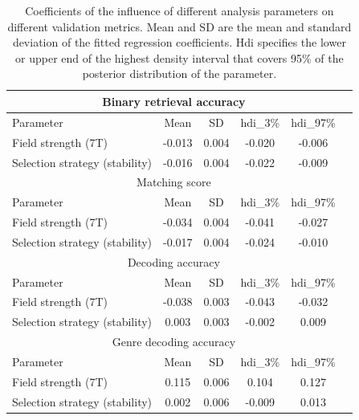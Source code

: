 \noindent
\begin{table}[!htbp]
\centering
\begin{adjustbox}{center}
\begin{tabular}{lccccc}
\multicolumn{5}{c}{Binary retrieval accuracy} \tabularnewline
\hline
Parameter &   Mean &     SD &  hdi\_3\% &  hdi\_97\% \tabularnewline
\hline
Field strength (7T)            & -0.013 &  0.004 &  -0.020 &   -0.006 \tabularnewline
Selection strategy (stability) & -0.016 &  0.004 &  -0.022 &   -0.009 \\
\hline
\multicolumn{5}{c}{Matching score} \tabularnewline
\hline
Parameter &   Mean &     SD &  hdi\_3\% &  hdi\_97\% \\
\hline
Field strength (7T)             & -0.034 &  0.004 &  -0.041 &   -0.027 \\
Selection strategy (stability)  & -0.017 &  0.004 &  -0.024 &   -0.010 \\
\hline
\multicolumn{5}{c}{Decoding accuracy} \tabularnewline
\hline
Parameter &   Mean &     SD &  hdi\_3\% &  hdi\_97\% \\
\hline
Field strength (7T)            & -0.038 &  0.003 &  -0.043 &   -0.032 \\
Selection strategy (stability) &  0.003 &  0.003 &  -0.002 &    0.009 \\
\hline
\multicolumn{5}{c}{Genre decoding accuracy} \tabularnewline
\hline
Parameter &   Mean &     SD &  hdi\_3\% &  hdi\_97\% \\
\hline
Field strength (7T)            &  0.115 &  0.006 &   0.104 &    0.127 \\
Selection strategy (stability) &  0.002 &  0.006 &  -0.009 &    0.013 \\
\hline
\end{tabular}
\end{adjustbox}
\caption{Coefficients of the influence of different analysis parameters on different validation metrics. Mean and SD are the mean and standard deviation of the fitted regression coefficients. Hdi specifies the lower or upper end of the highest density interval that covers 95\% of the posterior distribution of the parameter.}
\label{table:hierarchical_model}
\end{table}



